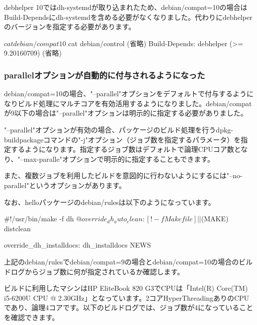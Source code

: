\documentclass[mingoth,a4paper]{jsarticle}
\begin{document}
debhelper 10ではdh-systemdが取り込まれたため、debian/compat=10の場合はBuild-Dependsにdh-systemdを含める必要がなくなりました。代わりにdebhelperのバージョンを指定する必要があります。

\begin{commandline}
  $ cat debian/compat
  10
  $ cat debian/control
  (省略)
  Build-Depends: debhelper (>= 9.20160709)
  (省略)
\end{commandline}


\subsubsection{parallelオプションが自動的に付与されるようになった}

debian/compat=10の場合、"--parallel"オプションをデフォルトで付与するようになりビルド処理にマルチコアを有効活用するようになりました。debian/compatが9以下の場合は"--parallel"オプションは明示的に指定する必要がありました。

"--parallel"オプションが有効の場合、パッケージのビルド処理を行うdpkg-buildpackageコマンドの"-j"オプション（ジョブ数を指定するパラメータ）を指定するようになります。指定するジョブ数はデフォルトで論理CPUコア数となり、"--max-paralle"オプションで明示的に指定することもできます。

また、複数ジョブを利用したビルドを意図的に行わないようにするには"--no-parallel"というオプションがあります。


なお、helloパッケージのdebian/rulesは以下のようになっています。

\begin{commandline}
#!/usr/bin/make -f
    dh $@

override_dh_auto_clean:
    [ ! -f Makefile ] || $(MAKE) distclean

override_dh_installdocs:
    dh_installdocs NEWS
\end{commandline}

上記のdebian/rulesでdebian/compat=9の場合とdebian/compat=10の場合のビルドログからジョブ数に何が指定されているか確認します。

ビルドに利用したマシンはHP EliteBook 820 G3でCPUは「Intel(R) Core(TM) i5-6200U CPU @ 2.30GHz」となっています。2コアHyperThreadingありのCPUであり、論理4コアです。以下のビルドログでは、ジョブ数が4になっていることを確認できます。
\end{document}
